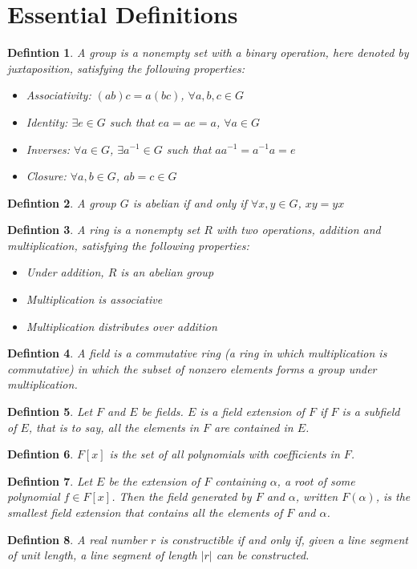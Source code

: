 \documentclass[]{article}
\newtheorem*{mydef}{Defintion}
\begin{document}
\section{Essential Definitions}
\begin{mydef}
	A group is a nonempty set with a binary operation, here denoted by juxtaposition, satisfying the following properties:
	\begin{itemize}
		\item Associativity: $(ab)c=a(bc)$,   $\forall a,b,c \in G$
		\item Identity: $\exists e \in G$ such that $ea=ae=a$,   $\forall a \in G$
		\item Inverses: $\forall a \in G$, $\exists a^{-1} \in G$ such that $aa^{-1}=a^{-1}a=e$
		\item Closure: $\forall a,b \in G$, $ab=c \in G$
	\end{itemize}
\end{mydef}
\begin{mydef}
	A group $G$ is abelian if and only if $\forall x,y \in G$, $xy=yx$
\end{mydef}
\begin{mydef}
	A ring is a nonempty set $R$ with two operations, addition and multiplication, satisfying the following properties:
	\begin{itemize}
		\item Under addition, $R$ is an abelian group
		\item Multiplication is associative
		\item Multiplication distributes over addition
	\end{itemize}
\end{mydef}
\begin{mydef}
	A field is a commutative ring (a ring in which multiplication is commutative) in which the subset of nonzero elements forms a group under multiplication.
\end{mydef}
\begin{mydef}
	Let $F$ and $E$ be fields. $E$ is a field extension of $F$ if $F$ is a subfield of $E$, that is to say, all the elements in $F$ are contained in $E$.
\end{mydef}
\begin{mydef}
	$F[x]$ is the set of all polynomials with coefficients in $F$.
\end{mydef}
\begin{mydef}
	Let $E$ be the extension of $F$ containing $\alpha$, a root of some polynomial $f \in F[x]$. Then the field generated by $F$ and $\alpha$, written $F(\alpha)$, is the smallest field extension that contains all the elements of $F$ and $\alpha$.
\end{mydef}
\begin{mydef}
	A real number $r$ is constructible if and only if, given a line segment of unit length, a line segment of length $|r|$ can be constructed.
\end{mydef}
\end{document}
